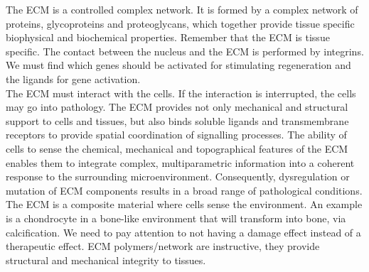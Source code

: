 \noindent
The ECM is a controlled complex network. It is formed by a complex network of proteins, glycoproteins and proteoglycans, which together provide tissue specific biophysical and biochemical properties. Remember that the ECM is tissue specific. The contact between the nucleus and the ECM is performed by integrins. We must find which genes should be activated for stimulating regeneration and the ligands for gene activation.
\\
\noindent
The ECM must interact with the cells. If the interaction is interrupted, the cells may go into pathology.
The ECM provides not only mechanical and structural support to cells and tissues, but also binds soluble ligands and transmembrane receptors to provide spatial coordination of signalling processes.
The ability of cells to sense the chemical, mechanical and topographical features of the ECM enables them to integrate complex, multiparametric information into a coherent response to the surrounding microenvironment.
Consequently, dysregulation or mutation of ECM components results in a broad range of pathological conditions.
\\
\noindent
The ECM is a composite material where cells sense the environment.
An example is a chondrocyte in a bone-like environment that will transform into bone, via calcification.
We need to pay attention to not having a damage effect instead of a therapeutic effect.
ECM polymers/network are instructive,  they provide structural and mechanical integrity to tissues.

